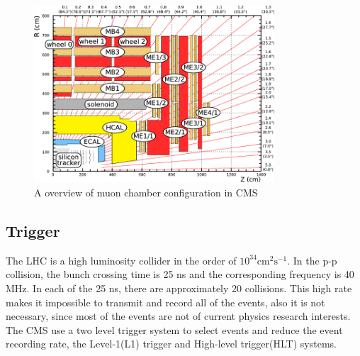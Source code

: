 \begin{figure}[htbp] 
\centering
\includegraphics[width=0.8\textwidth]{chapter3/Muon_chambers.png}
\caption{A overview of muon chamber configuration in CMS~\cite{Muon_chambers}}
\label{fig:muon_sketch}
\end{figure}


\subsection{Trigger}

The LHC is a high luminosity collider in the order of $10^{34}\textrm{cm}^{2}\textrm{s}^{-1}$. In the p-p collision, the bunch crossing time is 25 ns and the corresponding frequency is 40 MHz. In each of the 25 ns, there are approximately 20 collisions. This high rate makes it impossible to transmit and record all of the events, also it is not necessary, since most of the events are not of current physics research interests. The CMS use a two level trigger system to select events and reduce the event recording rate, the Level-1(L1) trigger and High-level trigger(HLT) systems. 


